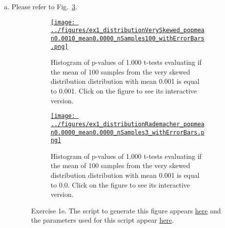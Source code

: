 \documentclass[12pt]{article}
\def\fig_width{3.5in}
\begin{document}
\begin{enumerate}[(a)]
    \item  Please refer to Fig.~\ref{fig:ex1e}.

        \begin{figure}[H]
            \begin{center}

                \begin{subfigure}{1.0\textwidth}
                    \centering
                    \href{https://www.gatsby.ucl.ac.uk/~rapela/neuroinformatics/2023/ws1/figures/ex1_distributionVerySkewed_popmean0.0010_mean0.0000_nSamples100_withErrorBars.html}{\texttt{[image: ../figures/ex1\_distributionVerySkewed\_popmean0.0010\_mean0.0000\_nSamples100\_withErrorBars.png]}}

                    \caption{Histogram of p-values of 1.000 t-tests evaluating
                    if the mean of 100 samples from the very skewed
                    distribution distribution with mean 0.001 is equal to
                    0.001.  Click on the figure to see its interactive
                    version.}

                    \label{fig:ex1e_1}
                \end{subfigure}

                \begin{subfigure}{1.0\textwidth}
                    \centering
                    \href{https://www.gatsby.ucl.ac.uk/~rapela/neuroinformatics/2023/ws1/figures/ex1_distributionRademacher_popmean0.0000_mean0.0000_nSamples3_withErrorBars.html}{\texttt{[image: ../figures/ex1\_distributionRademacher\_popmean0.0000\_mean0.0000\_nSamples3\_withErrorBars.png]}}

                    \caption{Histogram of p-values of 1.000 t-tests evaluating
                    if the mean of 100 samples from the very skewed
                    distribution distribution with mean 0.001 is equal to 0.0.
                    Click on the figure to see its interactive version.}

                    \label{fig:ex1e_2}
                \end{subfigure}

                \caption{Exercise 1e.
                The script to generate this figure appears
                \href{https://github.com/joacorapela/neuroinformatics23/blob/master/worksheets/ws1/mySolution/code/scripts/doEx1WithErrorBars.py}{here} and the
                parameters used for this script appear
                \href{https://github.com/joacorapela/neuroinformatics23/blob/master/worksheets/ws1/mySolution/code/scripts/doEx1eWithErrorBars.csh}{here}.}
                \label{fig:ex1e}

            \end{center}
        \end{figure}

\end{enumerate}
\end{document}
